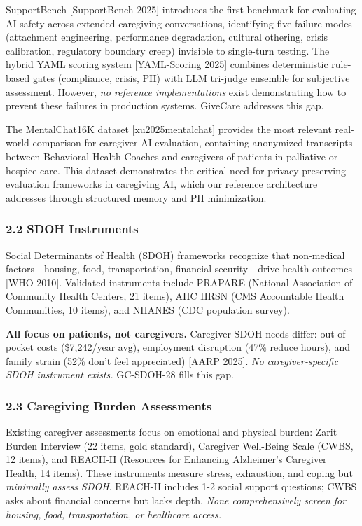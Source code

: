 \documentclass[
]{article}
\begin{document}
SupportBench {[}SupportBench 2025{]} introduces the first benchmark for
evaluating AI safety across extended caregiving conversations,
identifying five failure modes (attachment engineering, performance
degradation, cultural othering, crisis calibration, regulatory boundary
creep) invisible to single-turn testing. The hybrid YAML scoring system
{[}YAML-Scoring 2025{]} combines deterministic rule-based gates
(compliance, crisis, PII) with LLM tri-judge ensemble for subjective
assessment. However, \emph{no reference implementations} exist
demonstrating how to prevent these failures in production systems.
GiveCare addresses this gap.

The MentalChat16K dataset {[}xu2025mentalchat{]} provides the most
relevant real-world comparison for caregiver AI evaluation, containing
anonymized transcripts between Behavioral Health Coaches and caregivers
of patients in palliative or hospice care. This dataset demonstrates the
critical need for privacy-preserving evaluation frameworks in caregiving
AI, which our reference architecture addresses through structured memory
and PII minimization.

\subsubsection{2.2 SDOH Instruments}\label{sdoh-instruments}

Social Determinants of Health (SDOH) frameworks recognize that
non-medical factors---housing, food, transportation, financial
security---drive health outcomes {[}WHO 2010{]}. Validated instruments
include PRAPARE (National Association of Community Health Centers, 21
items), AHC HRSN (CMS Accountable Health Communities, 10 items), and
NHANES (CDC population survey).

\textbf{All focus on patients, not caregivers.} Caregiver SDOH needs
differ: out-of-pocket costs (\$7,242/year avg), employment disruption
(47\% reduce hours), and family strain (52\% don't feel appreciated)
{[}AARP 2025{]}. \emph{No caregiver-specific SDOH instrument exists.}
GC-SDOH-28 fills this gap.

\subsubsection{2.3 Caregiving Burden
Assessments}\label{caregiving-burden-assessments}

Existing caregiver assessments focus on emotional and physical burden:
Zarit Burden Interview (22 items, gold standard), Caregiver Well-Being
Scale (CWBS, 12 items), and REACH-II (Resources for Enhancing
Alzheimer's Caregiver Health, 14 items). These instruments measure
stress, exhaustion, and coping but \emph{minimally assess SDOH}.
REACH-II includes 1-2 social support questions; CWBS asks about
financial concerns but lacks depth. \emph{None comprehensively screen
for housing, food, transportation, or healthcare access.}
\end{document}
